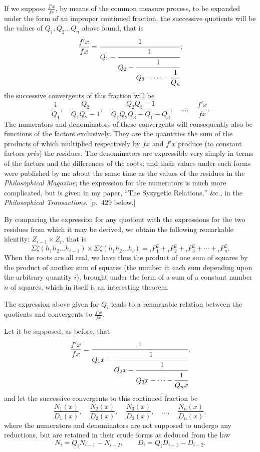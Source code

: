\documentclass[11pt]{article}
\newcommand{\sourcepage}[1]{\marginpar{\scriptsize p.~#1}}
\begin{document}
{{\sourcepage{397}
If we suppose $\frac{f'x}{fx}$, by means of the common measure process, to be expanded under the form of an improper continued fraction, the successive quotients will be the values of $Q_1,Q_2\ldots Q_n$ above found, that is
\[
\frac{f'x}{fx}=\cfrac{1}{Q_1-\cfrac{1}{Q_2-\cfrac{1}{Q_3-\cdots-\cfrac{1}{Q_n}}}};
\]
the successive convergents of this fraction will be
\[
\frac1{Q_1},\quad
\frac{Q_2}{Q_1Q_2-1},\quad
\frac{Q_2Q_3-1}{Q_1Q_2Q_3-Q_1-Q_3},\quad\ldots,\quad
\frac{f'x}{fx}.
\]
The numerators and denominators of these convergents will consequently also be functions of the factors exclusively. They are the quantities the sum of the products of which multiplied respectively by $fx$ and $f'x$ produce (to constant factors \emph{près}) the residues. The denominators are expressible very simply in terms of the factors and the differences of the roots; and their values under such forms were published by me about the same time as the values of the residues in the \emph{Philosophical Magazine}; the expression for the numerators is much more complicated, but is given in my paper, ``The Syzygetic Relations,'' \&c., in the \emph{Philosophical Transactions}. [p.~429 below.]

By comparing the expression for any quotient with the expressions for the two residues from which it may be derived, we obtain the following remarkable identity: $Z_{i-1}\times Z_i$, that is
\[
\Sigma\zeta(h_1h_2\ldots h_{i-1})\times
\Sigma\zeta(h_1h_2\ldots h_i)
={}_iP_1^2+{}_iP_2^2+{}_iP_3^2+\cdots+{}_iP_n^2.
\]
When the roots are all real, we have thus the product of one sum of squares by the product of another sum of squares (the number in each sum depending upon the arbitrary quantity $i$), brought under the form of a sum of a constant number $n$ of squares, which in itself is an interesting theorem.

The expression above given for $Q_i$ leads to a remarkable relation between the quotients and convergents to $\frac{f'x}{fx}$.

Let it be supposed, as before, that
\[
\frac{f'x}{fx}
=\cfrac{1}{Q_1x-\cfrac{1}{Q_2x-\cfrac{1}{Q_3x-\cdots-\cfrac{1}{Q_nx}}}},
\]
and let the successive convergents to this continued fraction be
\[
\frac{N_1(x)}{D_1(x)},\quad
\frac{N_2(x)}{D_2(x)},\quad
\frac{N_3(x)}{D_3(x)},\quad\ldots,\quad
\frac{N_n(x)}{D_n(x)},
\]
where the numerators and denominators are not supposed to undergo any reductions, but are retained in their crude forms as deduced from the law
\[
N_i=Q_iN_{i-1}-N_{i-2},\qquad
D_i=Q_iD_{i-1}-D_{i-2}.
\]

}}
\end{document}
